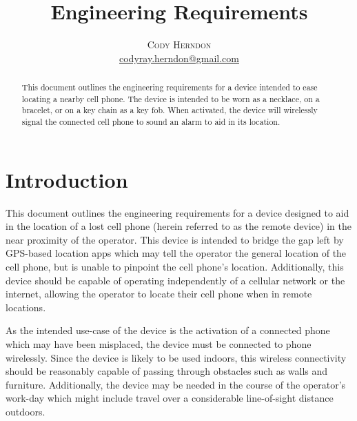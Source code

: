 \documentclass[twoside]{article}
\title{\vspace{-15mm}\fontsize{24pt}{10pt}\selectfont\textbf{Engineering Requirements}} %
\author{
\large
\textsc{Cody Herndon}\\[2mm] %
\normalsize \href{mailto:codyray.herndon@gmail.com}{codyray.herndon@gmail.com} %
\vspace{-5mm}
}
\date{}
\begin{document}
\maketitle %

\thispagestyle{fancy} %


\begin{abstract}

\noindent This document outlines the engineering requirements for a device intended to ease locating a nearby cell phone.  The device is intended to be worn as a necklace, on a bracelet, or on a key chain as a key fob.  When activated, the device will wirelessly signal the connected cell phone to sound an alarm to aid in its location.

\end{abstract}


\section{Introduction}

This document outlines the engineering requirements for a device designed to aid in the location of a lost cell phone (herein referred to as the remote device) in the near proximity of the operator.  This device is intended to bridge the gap left by GPS-based location apps which may tell the operator the general location of the cell phone, but is unable to pinpoint the cell phone's location.  Additionally, this device should be capable of operating independently of a cellular network or the internet, allowing the operator to locate their cell phone when in remote locations.

As the intended use-case of the device is the activation of a connected phone which may have been misplaced, the device must be connected to phone wirelessly.  Since the device is likely to be used indoors, this wireless connectivity should be reasonably capable of passing through obstacles such as walls and furniture.  Additionally, the device may be needed in the course of the operator's work-day which might include travel over a considerable line-of-sight distance outdoors.
\end{document}
